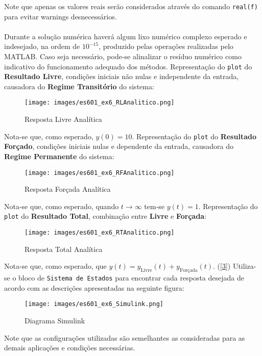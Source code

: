 \documentclass{article}
\begin{document}
\begin{resolution}
    \begin{scriptsize}
        \myOctave
    \end{scriptsize}
    Note que apenas os valores reais serão considerados através do comando \texttt{real(f)} para evitar warnings desnecessários.\\\\
    Durante a solução numérica haverá algum lixo numérico complexo esperado e indesejado, na ordem de $10^{-15}$, produzido pelas operações realizadas pelo MATLAB. Caso seja necessário, pode-se alinalizar o resíduo numérico como indicativo do funcionamento adequado dos métodos.
\newpage
    Representação do \texttt{plot} do \textbf{Resultado Livre}, condições iniciais não nulas e independente da entrada, causadora do \textbf{Regime Transitório} do sistema:
    \begin{figure}[H]
        \centering
        \texttt{[image: images/es601\_ex6\_RLAnalitico.png]}
        \caption{Resposta Livre Analítica}
    \end{figure}
    Nota-se que, como esperado, $y(0) = 10$. Representação do \texttt{plot} do \textbf{Resultado Forçado}, condições iniciais nulas e dependente da entrada, causadora do \textbf{Regime Permanente} do sistema:
    \begin{figure}[H]
        \centering
        \texttt{[image: images/es601\_ex6\_RFAnalitico.png]}
        \caption{Resposta Forçada Analítica}
    \end{figure}
    Nota-se que, como esperado, quando $t\to\infty$ tem-se $y(t) = 1$. Representação do \texttt{plot} do \textbf{Resultado Total}, combinação entre \textbf{Livre} e \textbf{Forçada}:
    \begin{figure}[H]
        \centering
        \texttt{[image: images/es601\_ex6\_RTAnalitico.png]}
        \caption{Resposta Total Analítica}
    \end{figure}
    Nota-se que, como esperado, que $y(t) = y_\text{Livre}(t) + y_\text{Forçada}(t)$.
\newpage
    (\ref{3}) Utiliza-se o bloco de \texttt{Sistema de Estados} para encontrar cada resposta desejada de acordo com as descrições apresentadas na seguinte figura:
    \begin{figure}[H]
        \centering
        \texttt{[image: images/es601\_ex6\_Simulink.png]}
        \caption{Diagrama Simulink}
    \end{figure}
    Note que as configurações utilizadas são semelhantes as consideradas para as demais aplicações e condições necessárias.

\end{resolution}
\end{document}
